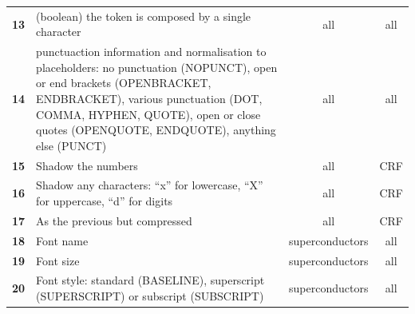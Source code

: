 \documentclass[]{interact}
\theoremstyle{plain}%
\theoremstyle{definition}
\theoremstyle{remark}
\begin{document}
\begin{table}[ht]
{\begin{tabular}{l m{30em} c c}
            \textbf{13}   & (boolean) the token is composed by a single character                                                                                                                                                                                                    & all             & all                   \\
            \textbf{14}   & punctuaction information and normalisation to placeholders: no punctuation (NOPUNCT), open or end brackets (OPENBRACKET, ENDBRACKET), various punctuation (DOT, COMMA, HYPHEN, QUOTE), open or close quotes (OPENQUOTE, ENDQUOTE), anything else (PUNCT) & all             & all                   \\
            \textbf{15}   & Shadow the numbers                                                                                                                                                                                                                                       & all             & CRF                   \\
            \textbf{16}   & Shadow any characters: ``x'' for lowercase, ``X'' for uppercase, ``d'' for digits                                                                                                                                                                        & all             & CRF                   \\
            \textbf{17}   & As the previous but compressed                                                                                                                                                                                                                           & all             & CRF                   \\
            \textbf{18}   & Font name                                                                                                                                                                                                                                                & superconductors & all                   \\
            \textbf{19}   & Font size                                                                                                                                                                                                                                                & superconductors & all                   \\
            \textbf{20}   & Font style: standard (BASELINE), superscript (SUPERSCRIPT) or subscript (SUBSCRIPT)                                                                                                                                                                      & superconductors & all                   \\

\end{tabular}}
\end{table}
\end{document}
